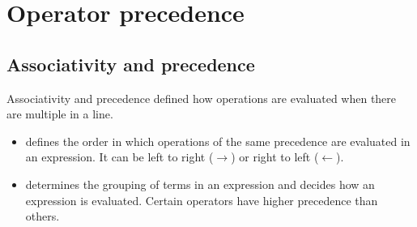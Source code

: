 \documentclass[a4paper]{article}
\begin{document}






\newpage
\tableofcontents
\newpage









\clearpage
\section{Operator precedence}


\subsection{Associativity and precedence}

Associativity and precedence defined how operations are evaluated when there are multiple in a line.
\begin{itemize}
    \item {} defines the order in which operations of the same precedence are evaluated in an expression. It can be left to right ($\rightarrow$) or right to left ($\leftarrow$).
    \item {}  determines the grouping of terms in an expression and decides how an expression is evaluated. Certain operators have higher precedence than others.
\end{itemize}
\end{document}
